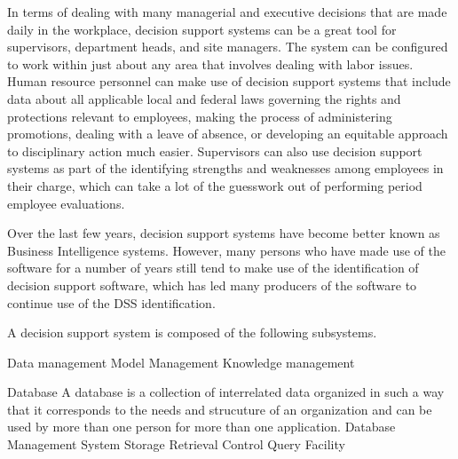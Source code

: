In terms of dealing with many managerial and executive decisions that are made daily in the workplace, decision support systems can be a great tool for supervisors, department heads, and site managers. The system can be configured to work within just about any area that involves dealing with labor issues. Human resource personnel can make use of decision support systems that include data about all applicable local and federal laws governing the rights and protections relevant to employees, making the process of administering promotions, dealing with a leave of absence, or developing an equitable approach to disciplinary action much easier. Supervisors can also use decision support systems as part of the identifying strengths and weaknesses among employees in their charge, which can take a lot of the guesswork out of performing period employee evaluations.

Over the last few years, decision support systems have become better known as Business Intelligence systems. However, many persons who have made use of the software for a number of years still tend to make use of the identification of decision support software, which has led many producers of the software to continue use of the DSS identification.

A decision support system is composed of the following subsystems.

Data management
Model Management
Knowledge management

Database
A database is a collection of interrelated data organized in such a way that it corresponds to the needs and strucuture of an organization and can be used by more than one person for more than one application.
Database Management System
Storage
Retrieval 
Control
Query Facility
